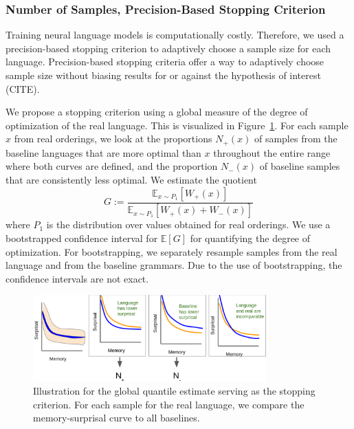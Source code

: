 \documentclass[11pt,letterpaper]{article}
\newcommand{\E}[0]{\mathbb{E}}
\begin{document}
\subsubsection{Number of Samples, Precision-Based Stopping Criterion}
Training neural language models is computationally costly.
Therefore, we used a precision-based stopping criterion to adaptively choose a sample size for each language.
Precision-based stopping criteria offer a way to adaptively choose sample size without biasing results for or against the hypothesis of interest (CITE).

We propose a stopping criterion using a global measure of the degree of optimization of the real language.
This is visualized in Figure~\ref{fig:quantile-global}.
For each sample $x$ from real orderings, we look at the proportions $N_+(x)$ of samples from the baseline languages that are more optimal than $x$ throughout the entire range where both curves are defined, and the proportion $N_-(x)$ of baseline samples that are consistently less optimal.
We estimate the quotient
\begin{equation}\label{eq:g}
	G :=	\frac{\E_{x \sim P_1}[W_+(x)]}{\E_{x \sim P_1}[W_+(x) + W_-(x)]}
\end{equation}
where $P_1$ is the distribution over values obtained for real orderings.
We use a bootstrapped confidence interval for $\E[G]$ for quantifying the degree of optimization.
For bootstrapping, we separately resample samples from the real language and from the baseline grammars.
Due to the use of bootstrapping, the confidence intervals are not exact.

\begin{figure}
	\begin{center}
\includegraphics[width=0.8\textwidth]{figures/quantile-global.png}
\end{center}
	\caption{Illustration for the global quantile estimate serving as the stopping criterion. For each sample for the real language, we compare the memory-surprisal curve to all baselines.}\label{fig:quantile-global}
\end{figure}
\end{document}
